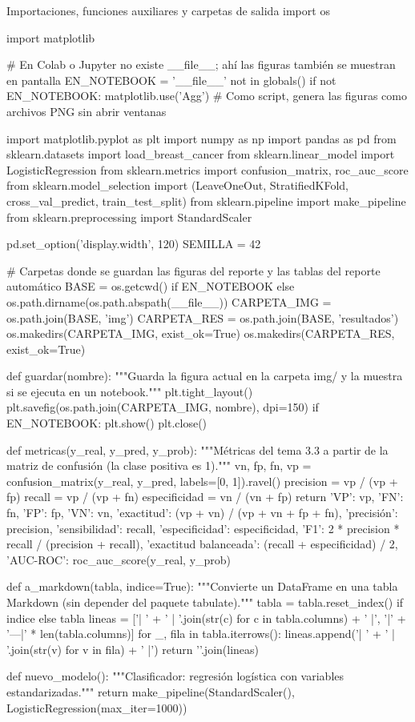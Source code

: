 \documentclass[11pt,letterpaper]{article}
\begin{document}
\begin{codigo}[label=cod:comun]{Importaciones, funciones auxiliares y carpetas de salida}
import os

import matplotlib

# En Colab o Jupyter no existe __file__; ahí las figuras también se muestran en pantalla
EN_NOTEBOOK = '__file__' not in globals()
if not EN_NOTEBOOK:
    matplotlib.use('Agg')  # Como script, genera las figuras como archivos PNG sin abrir ventanas

import matplotlib.pyplot as plt
import numpy as np
import pandas as pd
from sklearn.datasets import load_breast_cancer
from sklearn.linear_model import LogisticRegression
from sklearn.metrics import confusion_matrix, roc_auc_score
from sklearn.model_selection import (LeaveOneOut, StratifiedKFold, cross_val_predict,
                                     train_test_split)
from sklearn.pipeline import make_pipeline
from sklearn.preprocessing import StandardScaler

pd.set_option('display.width', 120)
SEMILLA = 42

# Carpetas donde se guardan las figuras del reporte y las tablas del reporte automático
BASE = os.getcwd() if EN_NOTEBOOK else os.path.dirname(os.path.abspath(__file__))
CARPETA_IMG = os.path.join(BASE, 'img')
CARPETA_RES = os.path.join(BASE, 'resultados')
os.makedirs(CARPETA_IMG, exist_ok=True)
os.makedirs(CARPETA_RES, exist_ok=True)


def guardar(nombre):
    """Guarda la figura actual en la carpeta img/ y la muestra si se ejecuta en un notebook."""
    plt.tight_layout()
    plt.savefig(os.path.join(CARPETA_IMG, nombre), dpi=150)
    if EN_NOTEBOOK:
        plt.show()
    plt.close()


def metricas(y_real, y_pred, y_prob):
    """Métricas del tema 3.3 a partir de la matriz de confusión (la clase positiva es 1)."""
    vn, fp, fn, vp = confusion_matrix(y_real, y_pred, labels=[0, 1]).ravel()
    precision = vp / (vp + fp)
    recall = vp / (vp + fn)
    especificidad = vn / (vn + fp)
    return {'VP': vp, 'FN': fn, 'FP': fp, 'VN': vn,
            'exactitud': (vp + vn) / (vp + vn + fp + fn),
            'precisión': precision, 'sensibilidad': recall, 'especificidad': especificidad,
            'F1': 2 * precision * recall / (precision + recall),
            'exactitud balanceada': (recall + especificidad) / 2,
            'AUC-ROC': roc_auc_score(y_real, y_prob)}


def a_markdown(tabla, indice=True):
    """Convierte un DataFrame en una tabla Markdown (sin depender del paquete tabulate)."""
    tabla = tabla.reset_index() if indice else tabla
    lineas = ['| ' + ' | '.join(str(c) for c in tabla.columns) + ' |',
              '|' + '---|' * len(tabla.columns)]
    for _, fila in tabla.iterrows():
        lineas.append('| ' + ' | '.join(str(v) for v in fila) + ' |')
    return '\n'.join(lineas)


def nuevo_modelo():
    """Clasificador: regresión logística con variables estandarizadas."""
    return make_pipeline(StandardScaler(), LogisticRegression(max_iter=1000))
\end{codigo}
\end{document}
